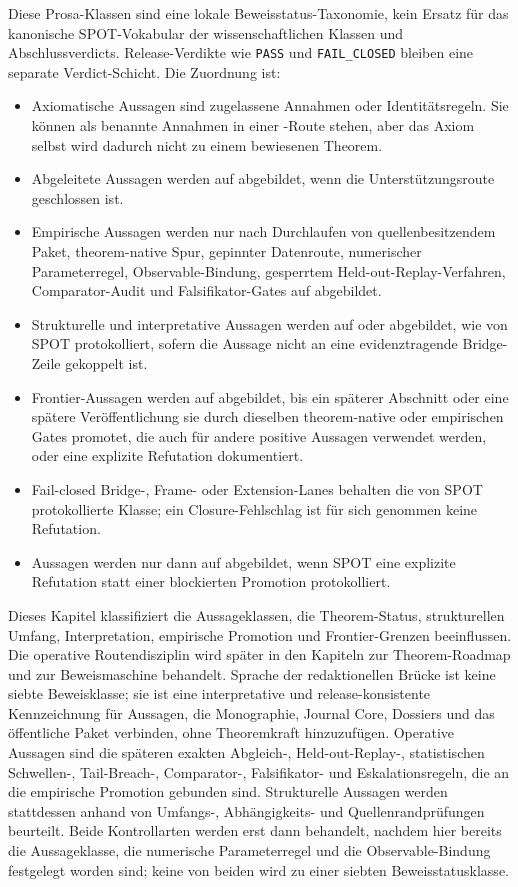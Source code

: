 Diese Prosa-Klassen sind eine lokale Beweisstatus-Taxonomie, kein Ersatz für
das kanonische SPOT-Vokabular der wissenschaftlichen Klassen und
Abschlussverdicts. Release-Verdikte wie \texttt{PASS} und
\texttt{FAIL\_CLOSED} bleiben eine separate Verdict-Schicht. Die Zuordnung ist:
\begin{itemize}
\item Axiomatische Aussagen sind zugelassene Annahmen oder Identitätsregeln.
      Sie können als benannte Annahmen in einer -Route
      stehen, aber das Axiom selbst wird dadurch nicht zu einem bewiesenen
      Theorem.
\item Abgeleitete Aussagen werden auf  abgebildet,
      wenn die Unterstützungsroute geschlossen ist.
\item Empirische Aussagen werden nur nach Durchlaufen von quellenbesitzendem
      Paket, theorem-native Spur, gepinnter Datenroute, numerischer
      Parameterregel, Observable-Bindung, gesperrtem Held-out-Replay-Verfahren,
      Comparator-Audit und Falsifikator-Gates auf 
      abgebildet.
\item Strukturelle und interpretative Aussagen werden auf 
      oder  abgebildet, wie von SPOT protokolliert, sofern
      die Aussage nicht an eine evidenztragende Bridge-Zeile gekoppelt ist.
\item Frontier-Aussagen werden auf  abgebildet, bis ein
      späterer Abschnitt oder eine spätere Veröffentlichung sie durch dieselben
      theorem-native oder empirischen Gates promotet, die auch für andere
      positive Aussagen verwendet werden, oder eine explizite Refutation
      dokumentiert.
\item Fail-closed Bridge-, Frame- oder Extension-Lanes behalten die von SPOT
      protokollierte Klasse; ein Closure-Fehlschlag ist für sich genommen keine
      Refutation.
\item Aussagen werden nur dann auf  abgebildet, wenn SPOT eine
      explizite Refutation statt einer blockierten Promotion protokolliert.
\end{itemize}
Dieses Kapitel klassifiziert die Aussageklassen, die Theorem-Status,
strukturellen Umfang, Interpretation, empirische Promotion und Frontier-Grenzen
beeinflussen. Die operative Routendisziplin wird später in den Kapiteln zur
Theorem-Roadmap und zur Beweismaschine behandelt.
Sprache der redaktionellen Brücke ist keine siebte Beweisklasse; sie ist eine
interpretative und release-konsistente Kennzeichnung für Aussagen, die
Monographie, Journal Core, Dossiers und das öffentliche Paket verbinden, ohne
Theoremkraft hinzuzufügen.
Operative Aussagen sind die späteren exakten Abgleich-, Held-out-Replay-,
statistischen Schwellen-, Tail-Breach-, Comparator-, Falsifikator- und
Eskalationsregeln, die an die empirische Promotion gebunden sind.
Strukturelle Aussagen werden stattdessen anhand von Umfangs-, Abhängigkeits-
und Quellenrandprüfungen beurteilt. Beide Kontrollarten werden erst dann
behandelt, nachdem hier bereits die Aussageklasse, die numerische
Parameterregel und die Observable-Bindung festgelegt worden sind; keine von
beiden wird zu einer siebten Beweisstatusklasse.

